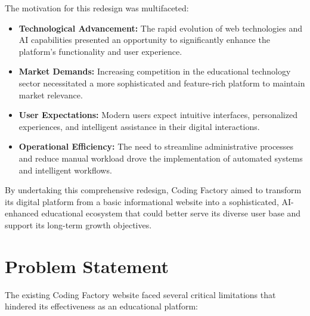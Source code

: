 \documentclass[12pt,a4paper]{report}
\begin{document}
The motivation for this redesign was multifaceted:

\begin{itemize}
    \item \textbf{Technological Advancement:} The rapid evolution of web technologies and AI capabilities presented an opportunity to significantly enhance the platform's functionality and user experience.

    \item \textbf{Market Demands:} Increasing competition in the educational technology sector necessitated a more sophisticated and feature-rich platform to maintain market relevance.

    \item \textbf{User Expectations:} Modern users expect intuitive interfaces, personalized experiences, and intelligent assistance in their digital interactions.

    \item \textbf{Operational Efficiency:} The need to streamline administrative processes and reduce manual workload drove the implementation of automated systems and intelligent workflows.
\end{itemize}

By undertaking this comprehensive redesign, Coding Factory aimed to transform its digital platform from a basic informational website into a sophisticated, AI-enhanced educational ecosystem that could better serve its diverse user base and support its long-term growth objectives.

\section{Problem Statement}
The existing Coding Factory website faced several critical limitations that hindered its effectiveness as an educational platform:
\end{document}
